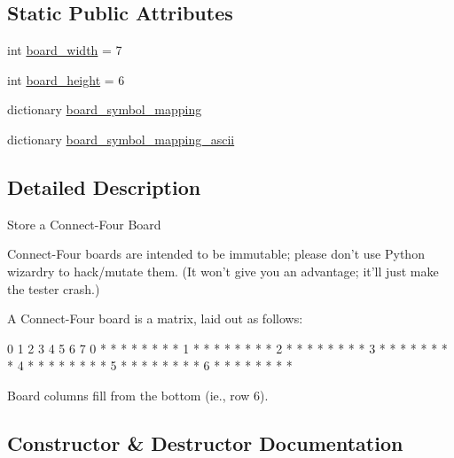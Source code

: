 \subsection*{Static Public Attributes}
\begin{DoxyCompactItemize}
\item 
int \hyperlink{classconnectfour_1_1_connect_four_board_a57326ec6b2c23f9dafd27d84f6ce0b27}{board\+\_\+width} = 7
\item 
int \hyperlink{classconnectfour_1_1_connect_four_board_a31a0129e0fd919af299f88e82a44348f}{board\+\_\+height} = 6
\item 
dictionary \hyperlink{classconnectfour_1_1_connect_four_board_a939160228737190efd67695aea4e08f1}{board\+\_\+symbol\+\_\+mapping}
\item 
dictionary \hyperlink{classconnectfour_1_1_connect_four_board_a7d5a560c3dde1e17eae92e13ce03f32a}{board\+\_\+symbol\+\_\+mapping\+\_\+ascii}
\end{DoxyCompactItemize}


\subsection{Detailed Description}
\begin{DoxyVerb}Store a Connect-Four Board

Connect-Four boards are intended to be immutable; please don't use
Python wizardry to hack/mutate them.  (It won't give you an advantage;
it'll just make the tester crash.)

A Connect-Four board is a matrix, laid out as follows:

     0 1 2 3 4 5 6 7
   0 * * * * * * * *
   1 * * * * * * * *
   2 * * * * * * * *
   3 * * * * * * * *
   4 * * * * * * * *
   5 * * * * * * * *
   6 * * * * * * * *

Board columns fill from the bottom (ie., row 6).
\end{DoxyVerb}
 

\subsection{Constructor \& Destructor Documentation}
\hypertarget{classconnectfour_1_1_connect_four_board_a9039d2f294b916f2c5139807e4aa1cb3}{}
